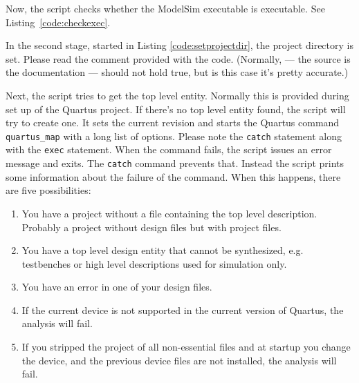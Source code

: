 \documentclass[11pt,a4paper,final,oneside,titlepage,fleqn]{article}
\begin{document}


Now, the script checks whether the ModelSim executable is executable. See Listing~\ref{code:checkexec}.



In the second stage, started in Listing \ref{code:setprojectdir}, the project
directory %
is set. Please read the comment provided
with the code. (Normally, --- the source is the documentation --- should not
hold true, but is this case it's pretty accurate.)



Next, the script tries to get the top level entity. Normally this is provided
during set up of the Quartus project. If there's no top level entity found,
the script will try to create one. It sets the current revision and starts the
Quartus command \texttt{quartus\_map} with a long list of options. Please note
the \texttt{catch} statement along with the \texttt{exec} statement. When the
command fails, the script issues an error message and exits. The \texttt{catch}
command prevents that. Instead the script prints some information about the
failure of the command. When this happens, there are five possibilities:

\begin{enumerate}
\item You have a project without a file containing the top level description.
Probably a project without design files but with project files.
\item You have a top level design entity that cannot be synthesized, e.g.
testbenches or high level descriptions used for simulation only.
\item You have an error in one of your design files.
\item If the current device is not supported in the current version of Quartus,
the analysis will fail.
\item If you stripped the project of all non-essential files and at startup you
change the device, and the previous device files are not installed, the
analysis will fail.
\end{enumerate}
\end{document}
